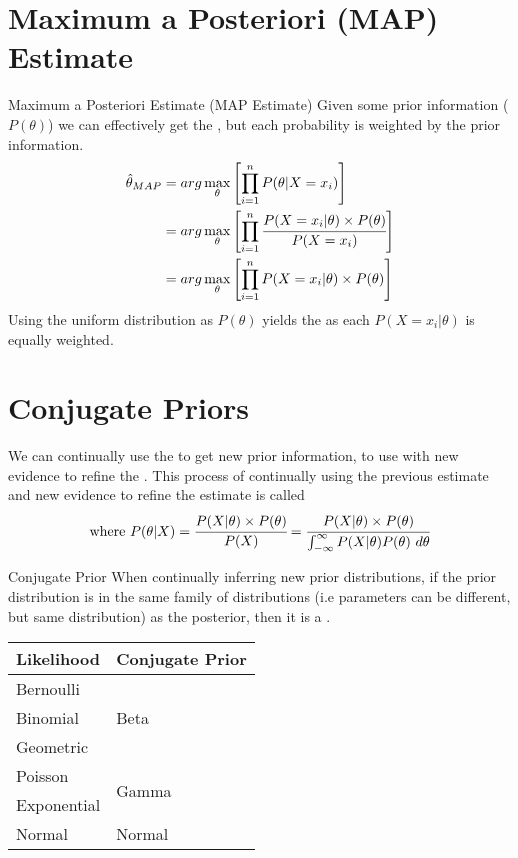\section{Maximum a Posteriori (MAP) Estimate}
\begin{definitionbox}{Maximum a Posteriori Estimate (MAP Estimate)}
	Given some prior information ($P(\theta)$)  we can effectively get the , but each probability is weighted by the prior information.
	\[\begin{split}
			\hat{\theta}_{MAP} &= arg \max_{\theta} \left[ \prod_{i=1}^n P(\theta|X = x_i) \right] \\
			&= arg \max_{\theta} \left[ \prod_{i=1}^n \cfrac{P(X = x_i|\theta) \times P(\theta)}{P(X = x_i)} \right] \\
			&= arg \max_{\theta} \left[ \prod_{i=1}^n P(X = x_i|\theta) \times P(\theta) \right] \\
		\end{split}\]
	Using the uniform distribution as $P(\theta)$ yields the  as each $P(X = x_i|\theta)$ is equally weighted.
\end{definitionbox}

\section{Conjugate Priors}

We can continually use the  to get new prior information, to use with new evidence to refine the . This process of continually using the previous estimate and new evidence to refine the estimate is called 
\[\text{where } P(\theta|X) = \cfrac{P(X|\theta) \times P(\theta)}{P(X)} = \cfrac{P(X|\theta) \times P(\theta)}{\int_{-\infty}^\infty P(X|\theta)P(\theta) \ d\theta}\]
\begin{definitionbox}{Conjugate Prior}
	When continually inferring new prior distributions, if the prior distribution is in the same family of distributions (i.e parameters can be different, but same distribution) as the posterior, then it is a .
	\begin{center}
		\begin{tabular}{l | l}
			\textbf{Likelihood} & \textbf{Conjugate Prior} \\
			\hline
			Bernoulli           & \multirow{3}{*}{Beta}    \\
			Binomial            &                          \\
			Geometric           &                          \\
			\hline
			Poisson             & \multirow{2}{*}{Gamma}   \\
			Exponential         &                          \\
			\hline
			Normal              & Normal                   \\
		\end{tabular}
	\end{center}
\end{definitionbox}

